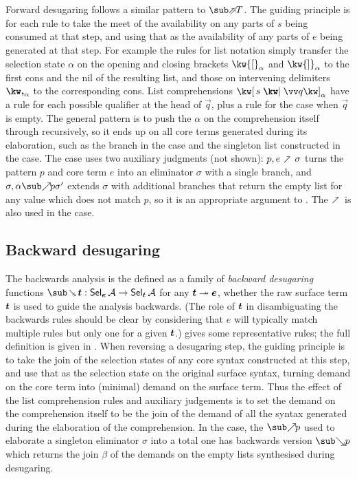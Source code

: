 Forward desugaring follows a similar pattern to $\evalFwdF{T}$. The guiding principle is for each rule to take the meet of the availability on any parts of $s$ being consumed at that step, and using that as the availability of any parts of $e$ being generated at that step. For example the rules for list notation simply transfer the selection state $\alpha$ on the opening and closing brackets $\annot{\kw{[}}{\alpha}$ and $\annot{\kw{]}}{\alpha}$ to the first cons and the nil of the resulting list, and those on intervening delimiters $\annot{\comma}{\alpha}$ to the corresponding cons. List comprehensions $\annListComp{s}{\vec{q}}{\alpha}$ have a rule for each possible qualifier at the head of $\vec{q}$, plus a rule for the case when $\vec{q}$ is empty. The general pattern is to push the $\alpha$ on the comprehension itself through recursively, so it ends up on all core terms generated during its elaboration, such as the  branch in the  case and the singleton list constructed in the  case. The  case uses two auxiliary judgments (not shown): $p, e \clauseFwdR \sigma$ turns the pattern $p$ and core term $e$ into an eliminator $\sigma$ with a single branch, and $\totaliseFwd{\sigma}{\alpha}{p}{\sigma'}$ extends $\sigma$ with additional branches that return the empty list for any value which does not match $p$, so it is an appropriate argument to . The $\clauseFwdR$ is also used in the  case.

\subsection{Backward desugaring}

The backwards analysis is the defined as a family of \textit{backward desugaring} functions $\desugarBwdR{\raw{t}}: \Sel{\raw{e}}{A} \to \Sel{\raw{t}}{A}$ for any $\bm{t} \twoheadrightarrow \bm{e}$, whether the raw surface term $\bm{t}$ is used to guide the analysis backwards. (The role of $\bm{t}$ in disambiguating the backwards rules should be clear by considering that $e$ will typically match multiple rules but only one for a given $\bm{t}$.)  gives some representative rules; the full definition is {\ifappendices given in  \else \IncludedWithSupplementaryMaterial.\fi} When reversing a desugaring step, the guiding principle is to take the join of the selection states of any core syntax constructed at this step, and use that as the selection state on the original surface syntax, turning demand on the core term into (minimal) demand on the surface term. Thus the effect of the list comprehension rules and auxiliary judgements is to set the demand on the comprehension itself to be the join of the demand of all the syntax generated during the elaboration of the comprehension. In the  case, the $\totaliseFwdR{p}$ used to elaborate a singleton eliminator $\sigma$ into a total one has backwards version $\totaliseBwdR{p}$ which returns the join $\beta$ of the demands on the empty lists synthesised during desugaring.


